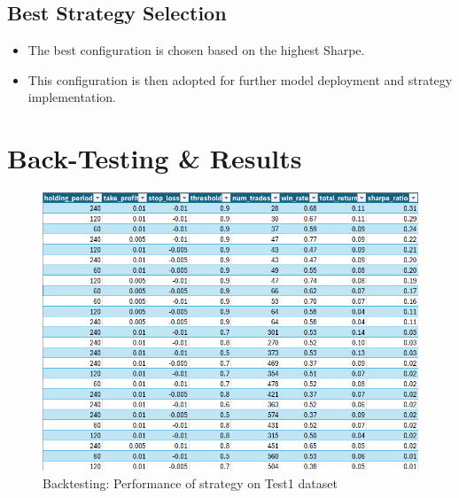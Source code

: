 \documentclass[11pt]{article}
\begin{document}
\subsection*{Best Strategy Selection}
\begin{itemize}
    \item The best configuration is chosen based on the highest Sharpe.
    \item This configuration is then adopted for further model deployment and strategy implementation.
\end{itemize}


\section{Back-Testing \& Results}
\begin{figure}[ht]
    \centering
    \includegraphics[width=1.2\textwidth]{AMZN/strategy _result_for_test_1.png}
    \caption{Backtesting: Performance of strategy on Test1 dataset}
    \label{fig:backtesting_strategy_test1}
\end{figure}

\end{document}
